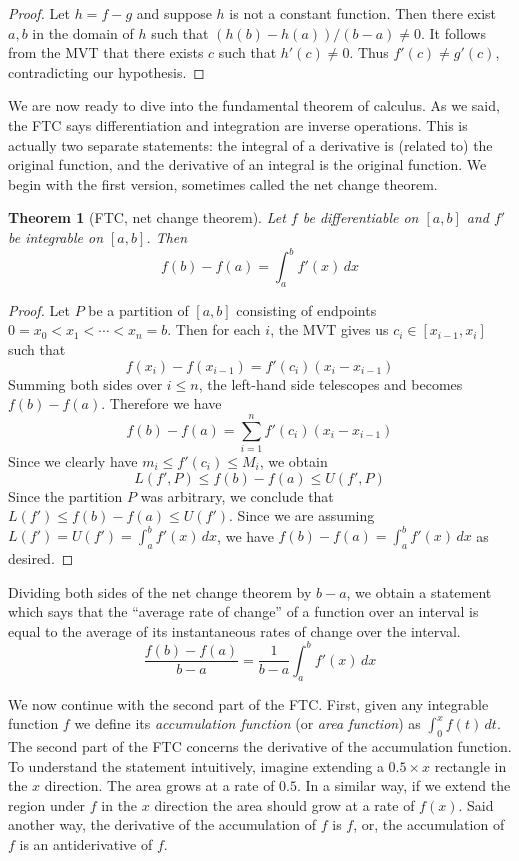 \documentclass[11pt,oneside]{amsbook}
\theoremstyle{definition}
\theoremstyle{plain}
\newtheorem{thm}{Theorem}[section]
\theoremstyle{definition}
\theoremstyle{remark}
\numberwithin{equation}{section}
\numberwithin{figure}{section}
\begin{document}
\begin{proof}
  Let $h=f-g$ and suppose $h$ is not a constant function. Then there exist $a,b$ in the domain of $h$ such that $(h(b)-h(a))/(b-a)\neq0$. It follows from the MVT that there exists $c$ such that $h'(c)\neq0$. Thus $f'(c)\neq g'(c)$, contradicting our hypothesis.
\end{proof}

We are now ready to dive into the fundamental theorem of calculus. As we said, the FTC says differentiation and integration are inverse operations. This is actually two separate statements: the integral of a derivative is (related to) the original function, and the derivative of an integral is the original function. We begin with the first version, sometimes called the net change theorem.

\begin{thm}[FTC, net change theorem]
  Let $f$ be differentiable on $[a,b]$ and $f'$ be integrable on $[a,b]$. Then
  \[f(b)-f(a)=\int_a^b f'(x)\,dx
  \]
\end{thm}

\begin{proof}
  Let $P$ be a partition of $[a,b]$ consisting of endpoints $0=x_0<x_1<\cdots<x_n=b$. Then for each $i$, the MVT gives us $c_i\in[x_{i-1},x_i]$ such that
  \[f(x_i)-f(x_{i-1})=f'(c_i)(x_i-x_{i-1})
  \]
  Summing both sides over $i\leq n$, the left-hand side telescopes and becomes $f(b)-f(a)$. Therefore we have
  \[f(b)-f(a)=\sum_{i=1}^n f'(c_i)(x_i-x_{i-1})
  \]
  Since we clearly have $m_i\leq f'(c_i)\leq M_i$, we obtain
  \[L(f',P)\leq f(b)-f(a)\leq U(f',P)
  \]
  Since the partition $P$ was arbitrary, we conclude that $L(f')\leq f(b)-f(a)\leq U(f')$. Since we are assuming $L(f')=U(f')=\int_a^bf'(x)\,dx$, we have $f(b)-f(a)=\int_a^bf'(x)\,dx$ as desired.
\end{proof}

Dividing both sides of the net change theorem by $b-a$, we obtain a statement which says that the ``average rate of change'' of a function over an interval is equal to the average of its instantaneous rates of change over the interval.
\[\frac{f(b)-f(a)}{b-a}=\frac{1}{b-a}\int_a^b f'(x)\,dx
\]

We now continue with the second part of the FTC. First, given any integrable function $f$ we define its \emph{accumulation function} (or \emph{area function}) as $\int_0^xf(t)\,dt$. The second part of the FTC concerns the derivative of the accumulation function. To understand the statement intuitively, imagine extending a $0.5\times x$ rectangle in the $x$ direction. The area grows at a rate of $0.5$. In a similar way, if we extend the region under $f$ in the $x$ direction the area should grow at a rate of $f(x)$. Said another way, the derivative of the accumulation of $f$ is $f$, or, the accumulation of $f$ is an antiderivative of $f$.
\end{document}
